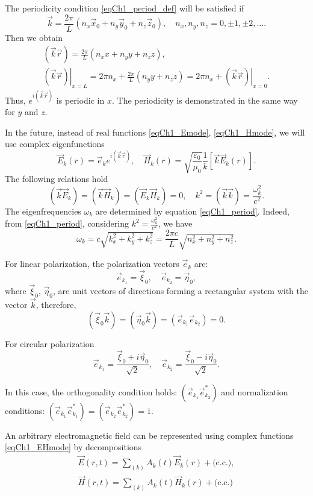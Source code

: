 The periodicity condition \eqref{eqCh1_period_def} will be satisfied if 
\begin{equation}
\vec{k} = \frac{2 \pi}{L}\left(n_x \vec{x}_0
+ n_y \vec{y}_0
+ n_z \vec{z}_0
\right),
\quad
n_x, n_y, n_z = 0, \pm 1, \pm 2, \dots .
\label{eqCh1_period}
\end{equation}
Then we obtain
\begin{eqnarray}
\left(\vec{k}\vec{r}\right) = \frac{2 \pi}{L}\left(n_x x
+ n_y y
+ n_z z
\right),
\nonumber \\
\left.\left(\vec{k}\vec{r}\right)\right|_{x = L} = 2 \pi n_x + \frac{2 \pi}{L}\left(n_y y
+ n_z z
\right) = 
2 \pi n_x + \left.\left(\vec{k}\vec{r}\right)\right|_{x = 0}.
\end{eqnarray}
Thus,    
$e^{i\left(\vec{k}\vec{r}\right)}$
is periodic in $x$. The periodicity is demonstrated in the same way for $y$ and $z$.
 
In the future, instead of real functions \eqref{eqCh1_Emode}, 
\eqref{eqCh1_Hmode}, we will use
complex eigenfunctions 
\begin{equation}
\vec{E}_k\left(r\right) = \vec{e}_k e^{i \left( \vec{k}\vec{r}\right)},
\quad
\vec{H}_k\left(r\right) = \sqrt{\frac{\varepsilon_0}{\mu_0}}\frac{1}{k}
\left[\vec{k}\vec{E}_k\left(r\right)\right].
\label{eqCh1_EHmode}
\end{equation}
The following relations hold
\[
\left(\vec{k}\vec{E}_k\right) = 
\left(\vec{k}\vec{H}_k\right) = 
\left(\vec{E}_k\vec{H}_k\right) = 0,
\quad
k^2 = \left(\vec{k}\vec{k}\right) = 
\frac{\omega_k^2}{c^2}.
\]
The eigenfrequencies $\omega_k$ are determined by equation
\eqref{eqCh1_period}. Indeed, from \eqref{eqCh1_period}, considering
$k^2 = \frac{\omega_k^2}{c^2}$, we have 
\begin{equation}
\omega_k = c \sqrt{k_x^2 + k_y^2 + k_z^2} = 
\frac{2 \pi c}{L} \sqrt{n_x^2 + n_y^2 + n_z^2}.
\end{equation}

For linear polarization, the polarization vectors $\vec{e}_k$ are:
\[
\vec{e}_{k_1} = \vec{\xi}_0,
\quad
\vec{e}_{k_2} = \vec{\eta}_0,
\]
where $\vec{\xi}_0$, $\vec{\eta}_0$, are unit vectors of directions forming a rectangular system with the vector $\vec{k}$, therefore, 
\[
\left(\vec{\xi}_0\vec{k}\right) =
\left(\vec{\eta}_0\vec{k}\right) =
\left(\vec{e}_{k_1}\vec{e}_{k_2}\right) = 0.
\]

For circular polarization
\[
\vec{e}_{k_1} = \frac{\vec{\xi}_0 + i \vec{\eta}_0}{\sqrt{2}},
\quad
\vec{e}_{k_2} = \frac{\vec{\xi}_0 - i \vec{\eta}_0}{\sqrt{2}}.
\]

In this case, the orthogonality condition holds:
$\left(\vec{e}_{k_1} \vec{e}_{k_2}^{*}\right)$
and normalization conditions:
$\left(\vec{e}_{k_1} \vec{e}_{k_1}^{*}\right) = \left(\vec{e}_{k_2}
\vec{e}_{k_2}^{*}\right) = 1$.

An arbitrary electromagnetic field can be represented using complex functions 
\eqref{eqCh1_EHmode} by decompositions 
\begin{eqnarray}
\vec{E}\left(r, t\right) = 
\sum_{(k)} 
A_k\left(t\right) \vec{E}_k\left(r\right) + \mbox{(c.c.)},
\nonumber \\
\vec{H}\left(r, t\right) = 
\sum_{(k)} 
A_k\left(t\right) \vec{H}_k\left(r\right) +
\mbox{(c.c.)}
\end{eqnarray}